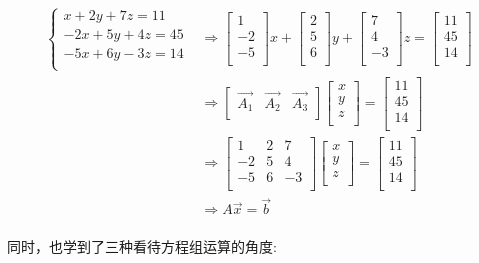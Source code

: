 \documentclass[fontset=none]{ctexart}
\begin{document}
\begin{align*}
	\begin{cases}
		x+2y+7z=11\\
		-2x+5y+4z=45\\
		-5x+6y-3z=14\\
	\end{cases} &\Longrightarrow 
	\left[ \begin{array}{c}
		1\\
		-2\\
		-5\\
	\end{array} \right] x+\left[ \begin{array}{c}
		2\\
		5\\
		6\\
	\end{array} \right] y+\left[ \begin{array}{c}
		7\\
		4\\
		-3\\
	\end{array} \right] z=\left[ \begin{array}{c}
		11\\
		45\\
		14\\
	\end{array} \right] 
	\\&\Longrightarrow \left[ \begin{matrix}
		\vec{A_1}&		\vec{A_2}&		\vec{A_3}\\
	\end{matrix} \right] \left[ \begin{array}{c}
		x\\
		y\\
		z\\
	\end{array} \right]=\left[ \begin{array}{c}
		11\\
		45\\
		14\\
	\end{array} \right] 
	\\&\Longrightarrow \left[ \begin{matrix}
		1&		2&		7\\
		-2&		5&		4\\
		-5&		6&		-3\\
	\end{matrix} \right] \left[ \begin{array}{c}
		x\\
		y\\
		z\\
	\end{array} \right] =\left[ \begin{array}{c}
		11\\
		45\\
		14\\
	\end{array} \right] 
	\\&\Longrightarrow A\vec{x}=\vec{b}
\end{align*}\\同时，也学到了三种看待方程组运算的角度:
\end{document}
